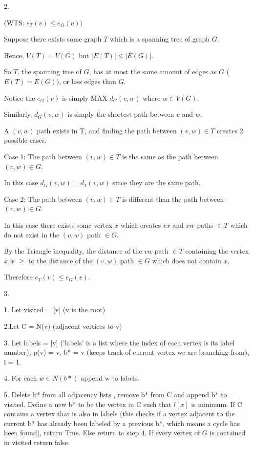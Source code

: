 \documentclass[12pt]{article}
\begin{document}
{
2.

(WTS: $e_{T}(v) \leq e_{G}(v))$

Suppose there exists some graph $T$ which is a spanning tree of graph $G$.

Hence, $V(T) = V(G)$ but $|E(T)| \leq |E(G)|$.

So $T$, the spanning tree of $G$, has at most the same amount of edges as $G$ ($E(T) = E(G))$, or less edges than $G$.

Notice the $e_{G}(v)$ is simply MAX $d_{G}(v,w)$ where $w \in V(G)$.

Similarly, $d_{G}(v,w)$ is simply the shortest path between $v$ and $w$.

A $(v,w)$ path exists in T, and finding the path between $(v,w) \in T$ creates 2 possible cases.

Case 1: The path between $(v,w) \in T$ is the same as the path between $(v,w) \in G$.

In this case $d_{G}(v,w) = d_{T}(v,w)$ since they are the same path.

Case 2: The path between $(v,w) \in T$ is different than the path between $(v,w) \in G$.

In this case there exists some vertex $x$ which creates $vx$ and $xw$ paths $\in T$ which do not exist in the $(v,w)$ path $ \in G$.

By the Triangle inequality, the distance of the $vw$ path $\in T$ containing the vertex $x$  is $\geq$ to the distance of the $(v,w)$ path $ \in G$ which does not contain $x$.

Therefore $e_{T}(v) \leq e_{G}(v)$.
}




3.
{

1. Let  visited = [v] (v is the root)

2.Let  C = N(v) (adjacent vertices to v)

3. Let labels = [v] ('labels' is a list where the index of each vertex is its label number), p(v) =  v, b* = v (keeps track of current vertex we are branching from), i = 1.

4. For each $w \in N(b*)$ append w to labels.

5. Delete b* from all adjacency lists , remove b* from C and append b* to visited. Define a new b* to be the vertex in C such that $l[x]$ is minimum.  If C contains a vertex that is also in labels (this checks if a vertex adjacent to the current b* has already been labeled by a previous b*, which means a cycle has been found), return True.  Else return to step 4. If every vertex of $G$ is contained in visited return false.
}
\end{document}
